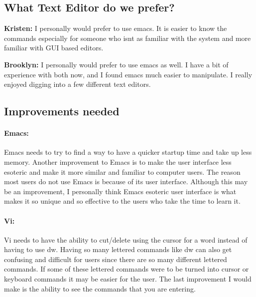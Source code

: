 \documentclass{article} %
\begin{document}
\noindent 

\noindent 
\subsection{What Text Editor do we prefer?}

\noindent 

\noindent \textbf{Kristen:} I personally would prefer to use emacs. It is easier to know the commands especially for someone who isnt as familiar with the system and more familiar with GUI based editors.

\noindent 

\noindent \textbf{Brooklyn:} I personally would prefer to use emacs as well. I have a bit of experience with both now, and I found emacs much easier to manipulate. I really enjoyed digging into a few different text editors.

\noindent 

\noindent 
\subsection{Improvements needed}

\noindent 

\noindent 
\paragraph{Emacs:}

\noindent 

\noindent Emacs needs to try to find a way to have a quicker startup time and take up less memory. Another improvement to Emacs is to make the user interface less esoteric and make it more similar and familiar to computer users. The reason most users do not use Emacs is because of its user interface. Although this may be an improvement, I personally think Emacs esoteric user interface is what makes it so unique and so effective to the users who take the time to learn it.

\noindent 

\noindent 
\paragraph{Vi:}

\noindent 

\noindent Vi needs to have the ability to cut/delete using the cursor for a word instead of having to use dw. Having so many lettered commands like dw can also get confusing and difficult for users since there are so many different lettered commands. If some of these lettered commands were to be turned into cursor or keyboard commands it may be easier for the user. The last improvement I would make is the ability to see the commands that you are entering. 

\noindent 

\noindent 

\noindent 
\end{document}
